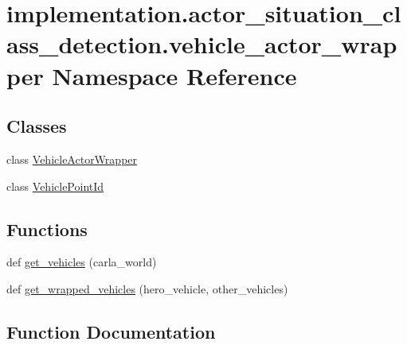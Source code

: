 \hypertarget{namespaceimplementation_1_1actor__situation__class__detection_1_1vehicle__actor__wrapper}{}\section{implementation.\+actor\+\_\+situation\+\_\+class\+\_\+detection.\+vehicle\+\_\+actor\+\_\+wrapper Namespace Reference}
\label{namespaceimplementation_1_1actor__situation__class__detection_1_1vehicle__actor__wrapper}
\subsection*{Classes}
\begin{DoxyCompactItemize}
\item 
class \hyperlink{classimplementation_1_1actor__situation__class__detection_1_1vehicle__actor__wrapper_1_1_vehicle_actor_wrapper}{Vehicle\+Actor\+Wrapper}
\item 
class \hyperlink{classimplementation_1_1actor__situation__class__detection_1_1vehicle__actor__wrapper_1_1_vehicle_point_id}{Vehicle\+Point\+Id}
\end{DoxyCompactItemize}
\subsection*{Functions}
\begin{DoxyCompactItemize}
\item 
def \hyperlink{namespaceimplementation_1_1actor__situation__class__detection_1_1vehicle__actor__wrapper_a617f2fc037ddf816b6364a6c9a2cc6de}{get\+\_\+vehicles} (carla\+\_\+world)
\item 
def \hyperlink{namespaceimplementation_1_1actor__situation__class__detection_1_1vehicle__actor__wrapper_a26064d7f9b5aea0f62876557ab520247}{get\+\_\+wrapped\+\_\+vehicles} (hero\+\_\+vehicle, other\+\_\+vehicles)
\end{DoxyCompactItemize}


\subsection{Function Documentation}
\mbox{\label{namespaceimplementation_1_1actor__situation__class__detection_1_1vehicle__actor__wrapper_a617f2fc037ddf816b6364a6c9a2cc6de}} 
